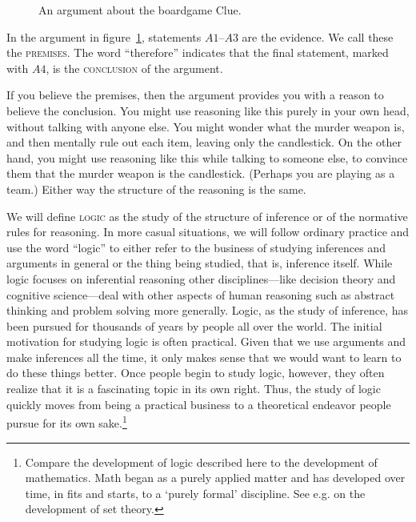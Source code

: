 \begin{figure}[!ht]
\begin{kormanize}
\end{kormanize}
\caption{An argument about the boardgame Clue.}
\label{arg:clue}
\end{figure}

In the argument in figure~\ref{arg:clue}, statements $A1$--$A3$ are the evidence. We call these the \textsc{\glspl{premise}}\label{def:premise}. The word ``therefore'' indicates that the final statement, marked with $A4$, is the \textsc{\gls{conclusion}}\label{def:conclusion} of the argument.

If you believe the premises, then the argument provides you with a reason to believe the conclusion. You might use reasoning like this purely in your own head, without talking with anyone else. You might wonder what the murder weapon is, and then mentally rule out each item, leaving only the candlestick. On the other hand, you might use reasoning like this while talking to someone else, to convince them that the murder weapon is the candlestick. (Perhaps you are playing as a team.) Either way the structure of the reasoning is the same.

We will define \textsc{\gls{logic}}\label{def:logic} as the study of the structure of inference or of the normative rules for reasoning. In more casual situations, we will follow ordinary practice and use the word ``logic'' to either refer to the business of studying inferences and arguments in general or the thing being studied, that is, inference itself. While logic focuses on inferential reasoning other disciplines---like decision theory and cognitive science---deal with other aspects of human reasoning such as abstract thinking and problem solving more generally. Logic, as the study of inference, has been pursued for thousands of years by people all over the world. The initial motivation for studying logic is often practical. Given that we use arguments and make inferences all the time, it only makes sense that we would want to learn to do these things better.  Once people begin to study logic, however, they often realize that it is a fascinating topic in its own right. Thus, the study of logic quickly moves from being a practical business to a theoretical endeavor people pursue for its own sake.\footnote{Compare the development of logic described here to the development of mathematics. Math began as a purely applied matter and has developed over time, in fits and starts, to a `purely formal' discipline. See e.g. \parencite{maddy2007} on the development of set theory.}


